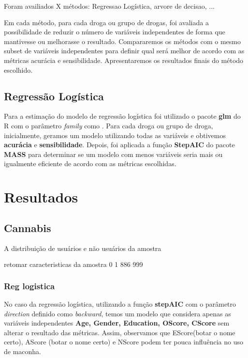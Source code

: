 \documentclass[
	article,			%
	11pt,				%
	oneside,			%
	a4paper,			%
	english,			%
	brazil,				%
	sumario=tradicional
	]{abntex2}
\begin{document}
Foram availiados X métodos: Regressao Logística, arvore de decisao, ... 

Em cada método, para cada droga ou grupo de drogas, foi avaliada a possibilidade de reduzir o número de variáveis independentes de forma que mantivesse ou melhorasse o resultado. Compararemos os métodos com o mesmo subset de variáveis independentes para definir qual será melhor de acordo com as métricas acurácia e sensibilidade. Apresentaremos os resultados finais do método escolhido. 

\subsection{Regressão Logística}

Para a estimação do modelo de regressão logística foi utilizado o pacote \textbf{glm} do R com o parâmetro \emph{family} como .
Para cada droga ou grupo de droga, inicialmente, geramos um modelo utilizando todas as variáveis e obtivemos \textbf{acurácia} e \textbf{sensibilidade}. Depois, foi aplicada a função \textbf{StepAIC} do pacote \textbf{MASS} para determinar se um modelo com menos variáveis seria mais ou igualmente eficiente de acordo com as métricas escolhidas.



\section{Resultados}

\subsection{Cannabis}

A distribuição de usuários e não usuários da amostra 

retomar caracteristicas da amostra
 0   1 
886 999 



\subsubsection{Reg logistica}

No caso da regressão logística, utilizando a função \textbf{stepAIC} com o parâmetro \emph{direction} definido como \emph{backward}, temos um modelo que considera apenas as variáveis independentes \textbf{Age, Gender, Education, OScore, CScore} sem alterar o resultado das métricas. Assim, observamos que EScore(botar o nome certo), AScore (botar o nome certo) e NScore podem ter pouca influência no uso de maconha.
\end{document}

